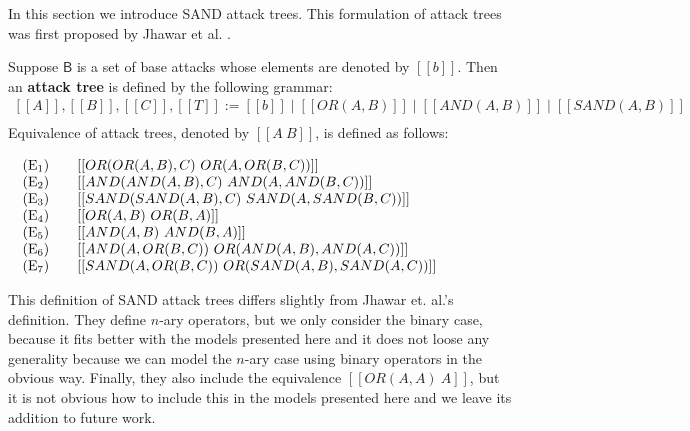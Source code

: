 In this section we introduce SAND attack trees.  This formulation of
attack trees was first proposed by Jhawar et al. \cite{Jhawar:2015}.
\begin{definition}
  \label{def:atrees}
  Suppose $\mathsf{B}$ is a set of base attacks whose elements are
  denoted by $[[b]]$.  Then an \textbf{attack tree} is defined by
  the following grammar:
  \[
  \begin{array}{lll}
    [[A]],[[B]],[[C]],[[T]] := [[b]] \mid [[OR(A,B)]] \mid [[AND(A,B)]] \mid [[SAND(A,B)]]\\
  \end{array}
  \]
  \noindent
  Equivalence of attack trees, denoted by $[[A ~ B]]$, is defined as
  follows:
  \begin{center}
    \begin{math}
      \setlength{\arraycolsep}{10px}
      \begin{array}{lll}
        (\text{E}_1) & [[OR(OR(A,B),C) ~ OR(A,OR(B,C))]]\\
        (\text{E}_2) & [[AND(AND(A,B),C) ~ AND(A,AND(B,C))]]\\
        (\text{E}_3) & [[SAND(SAND(A,B),C) ~ SAND(A,SAND(B,C))]]\\
        (\text{E}_4) & [[OR(A,B) ~ OR(B,A)]]\\
        (\text{E}_5) & [[AND(A,B) ~ AND(B,A)]]\\
        (\text{E}_6) & [[AND(A,OR(B,C)) ~ OR(AND(A,B),AND(A,C))]]\\
        (\text{E}_7) & [[SAND(A,OR(B,C)) ~ OR(SAND(A,B),SAND(A,C))]]\\
      \end{array}
    \end{math}
  \end{center}
\end{definition}
This definition of SAND attack trees differs slightly from Jhawar
et. al.'s~\cite{Jhawar:2015} definition.  They define $n$-ary
operators, but we only consider the binary case, because it fits better
with the models presented here and it does not loose any generality
because we can model the $n$-ary case using binary operators in the
obvious way.  Finally, they also include the equivalence $[[OR(A,A) ~
    A]]$, but it is not obvious how to include this in the models
presented here and we leave its addition to future work.

